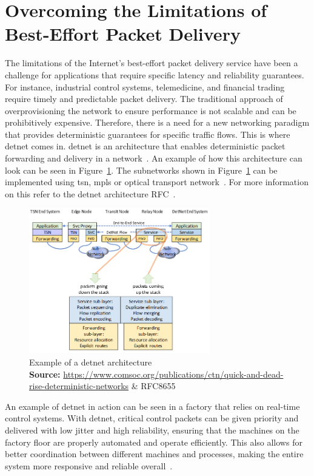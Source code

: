 \documentclass[runningheads]{llncs}
\newcommand*{\captionsource}[2]{%
  \caption[{#1}]{%
    #1%
    \\\hspace{\linewidth}%
    \textbf{Source:} #2%
  }%
}
\begin{document}
\section{Overcoming the Limitations of Best-Effort Packet Delivery}

The limitations of the Internet's best-effort packet delivery service have been a challenge for applications that require specific latency and reliability guarantees. For instance, industrial control systems, telemedicine, and financial trading require timely and predictable packet delivery. The traditional approach of overprovisioning the network to ensure performance is not scalable and can be prohibitively expensive. Therefore, there is a need for a new networking paradigm that provides deterministic guarantees for specific traffic flows. This is where \gls{detnet} comes in. \gls{detnet} is an architecture that enables deterministic packet forwarding and delivery in a network~\cite{Finn2018}. An example of how this architecture can look can be seen in Figure~\ref{fig:detnet-architecture}. The subnetworks shown in Figure~\ref{fig:detnet-architecture} can be implemented using \gls{tsn}, \gls{mpls} or optical transport network~\cite{rfc8655}. For more information on this refer to the \gls{detnet} architecture RFC~\cite{rfc8655}.

\begin{figure}[ht]
  \centering
  \includegraphics[width=0.7\textwidth]{detnet_simple_arch}
  \captionsource{Example of a \gls{detnet} architecture}{\url{https://www.comsoc.org/publications/ctn/quick-and-dead-rise-deterministic-networks} \& RFC8655\cite{rfc8655}}
  \label{fig:detnet-architecture}
\end{figure}

An example of \gls{detnet} in action can be seen in a factory that relies on real-time control systems. With \gls{detnet}, critical control packets can be given priority and delivered with low jitter and high reliability, ensuring that the machines on the factory floor are properly automated and operate efficiently. This also allows for better coordination between different machines and processes, making the entire system more responsive and reliable overall~\cite{rfc8578}.
\end{document}
